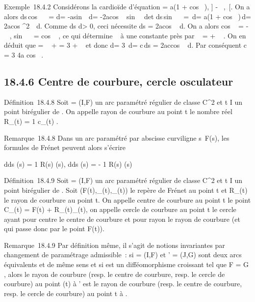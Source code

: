 \documentclass[]{article}
\begin{document}
Exemple~18.4.2 Considérons la cardioïde d'équation \rho = a(1
+ cos~ \theta), \theta \in] - \pi~,\pi~[. On a alors
ds\,cos~ \alpha~ = d\rho =
-asin~ \theta\,d\theta =
-2acos  \theta {}~
 sin  \theta {}~
\,d\theta et ds\,sin~
\alpha~ = \rho\,d\theta = a(1 + cos~
\theta)\,d\theta = 2acos ^2~
\theta {} \,d\theta. Comme  ds
\over d\theta > 0, ceci nécessite ds =
2acos  \theta {}~ d\theta. On a
alors cos \alpha~ = -\sin~
 \theta {} , sin~ \alpha~
= cos  \theta {}~ , ce qui
détermine \alpha~ à une constante près par \alpha~ = \theta {}
+ \pi~  . On en déduit que \phi = \alpha~ + \theta = 3\theta
{} + \pi~  et donc d\phi = 3
 \,d\theta = c\,ds =
2accos  \theta {}~ d\theta. Par
conséquent c = 3 \over 4a cos~
 \theta {}  .

\subsection{18.4.6 Centre de courbure, cercle osculateur}

Définition~18.4.8 Soit \Gamma = (I,F) un arc paramétré régulier de classe
C^2 et t \in I un point birégulier de \Gamma. On appelle rayon de
courbure au point t le nombre réel R_\Gamma(t) = 1
\over c_\Gamma(t) .

Remarque~18.4.8 Dans un arc paramétré par abscisse curviligne
s\mapsto~F(s), les formules de Frénet peuvent alors
s'écrire

 d\vect \over ds (s) = 1
\over R(s) \vecn(s),
d\vecn \over ds (s) = - 1
\over R(s) \vect(s)

Définition~18.4.9 Soit \Gamma = (I,F) un arc paramétré régulier de classe
C^2 et t \in I un point birégulier de \Gamma. Soit
(F(t),\vect_\Gamma(t),\vecn_\Gamma(t))
le repère de Frénet au point t et R_\Gamma(t) le rayon de courbure
au point t. On appelle centre de courbure au point t le point
C_\Gamma(t) = F(t) +
R_\Gamma(t)\vecn_\Gamma(t), on appelle cercle
de courbure au point t le cercle ayant pour centre le centre de courbure
et pour rayon le rayon de courbure (et qui passe donc par le point
F(t)).

Remarque~18.4.9 Par définition même, il s'agit de notions invariantes
par changement de paramétrage admissible~: si \Gamma = (I,F) et \Gamma' = (J,G)
sont deux arcs équivalents et de même sens et si \theta est un
difféomorphisme croissant tel que F = G \cdot \theta, alors le rayon de courbure
(resp. le centre de courbure, resp. le cercle de courbure) au point \theta(t)
à \Gamma' est le rayon de courbure (resp. le centre de courbure, resp. le
cercle de courbure) au point t à \Gamma.
\end{document}
